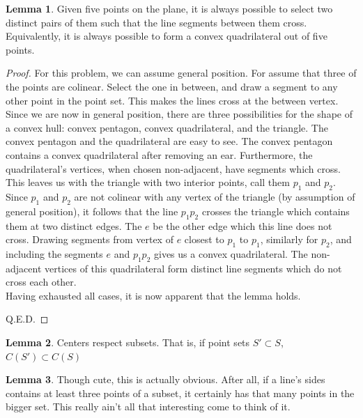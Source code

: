 \documentclass[12pt]{article}
\theoremstyle{definition}
\newtheorem{lemma}{Lemma}
\begin{document}
\begin{lemma}
Given five points on the plane, it is always possible to select two distinct pairs of them such that the line segments between them cross. Equivalently, it is always possible to form a convex quadrilateral out of five points.
\end{lemma}

\begin{proof}
For this problem, we can assume general position. For assume that three of the points are colinear. Select the one in between, and draw a segment to any other point in the point set. This makes the lines cross at the between vertex.\\

Since we are now in general position, there are three possibilities for the shape of a convex hull: convex pentagon, convex quadrilateral, and the triangle. The convex pentagon and the quadrilateral are easy to see. The convex pentagon contains a convex quadrilateral after removing an ear. Furthermore, the quadrilateral's vertices, when chosen non-adjacent, have segments which cross.\\

This leaves us with the triangle with two interior points, call them $p_1$ and $p_2$. Since $p_1$ and $p_2$ are not colinear with any vertex of the triangle (by assumption of general position), it follows that the line $p_1p_2$ crosses the triangle which contains them at two distinct edges. The $e$ be the other edge which this line does not cross. Drawing segments from vertex of $e$ closest to $p_1$ to $p_1$, similarly for $p_2$, and including the segments $e$ and $p_1p_2$ gives us a convex quadrilateral. The non-adjacent vertices of this quadrilateral form distinct line segments which do not cross each other.\\

Having exhausted all cases, it is now apparent that the lemma holds.

Q.E.D.
\end{proof}



\begin{lemma}
Centers respect subsets. That is, if point sets $S' \subset S$, $C(S')\subset C(S) $
\end{lemma}

\begin{lemma}
Though cute, this is actually obvious. After all, if a line's sides contains at least three points of a subset, it certainly has that many points in the bigger set. This really ain't all that interesting come to think of it.
\end{lemma}
\end{document}
